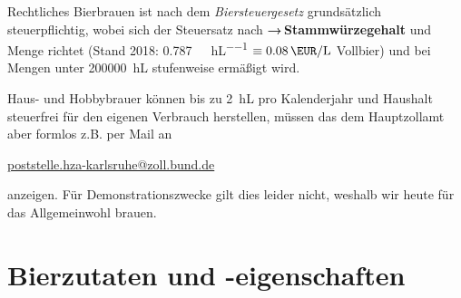 \documentclass[9pt, ngerman]{beamer}
\newcommand{\forward}[1]{\textbf{→\,#1}}
\begin{document}
\begin{frame}{Rechtliches}
  Bierbrauen ist nach dem \emph{Biersteuergesetz} grundsätzlich steuerpflichtig,
  wobei sich der Steuersatz nach \forward{Stammwürzegehalt} und Menge richtet
  (Stand 2018: \SI{0.787}{\EUR\per\dP\per\hL} $\equiv\SI{0.08}{\EUR\per\L}$ Vollbier) und bei Mengen unter
  \SI{200000}{\hL} stufenweise ermäßigt wird.

  Haus- und Hobbybrauer können bis zu \SI{2}{\hL} pro Kalenderjahr und Haushalt
  steuerfrei für den eigenen Verbrauch herstellen, müssen das dem Hauptzollamt
  aber formlos z.B. per Mail an
  \vspace{-0.5em}
  \begin{center}
    \href{mailto:poststelle.hza-karlsruhe@zoll.bund.de}{poststelle.hza-karlsruhe@zoll.bund.de}
  \end{center}
  \vspace{-0.5em}
  anzeigen. Für Demonstrationszwecke gilt dies leider nicht, weshalb wir heute
  für das Allgemeinwohl brauen.
\end{frame}

\section{Bierzutaten und -eigenschaften}
\end{document}
